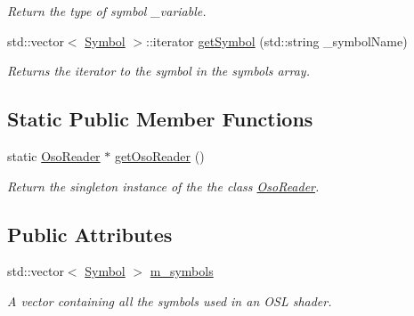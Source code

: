 \begin{DoxyCompactItemize}
\begin{DoxyCompactList}\small\item\em Return the type of symbol \-\_\-variable. \end{DoxyCompactList}\item 
\hypertarget{class_oso_reader_a6a3e710f4ed28396847353cb69b9f15b}{std\-::vector$<$ \hyperlink{struct_symbol}{Symbol} $>$\-::iterator \hyperlink{class_oso_reader_a6a3e710f4ed28396847353cb69b9f15b}{get\-Symbol} (std\-::string \-\_\-symbol\-Name)}\label{class_oso_reader_a6a3e710f4ed28396847353cb69b9f15b}

\begin{DoxyCompactList}\small\item\em Returns the iterator to the symbol in the symbols array. \end{DoxyCompactList}\end{DoxyCompactItemize}
\subsection*{Static Public Member Functions}
\begin{DoxyCompactItemize}
\item 
\hypertarget{class_oso_reader_ab7a5a31334d84529054d412e879993e2}{static \hyperlink{class_oso_reader}{Oso\-Reader} $\ast$ \hyperlink{class_oso_reader_ab7a5a31334d84529054d412e879993e2}{get\-Oso\-Reader} ()}\label{class_oso_reader_ab7a5a31334d84529054d412e879993e2}

\begin{DoxyCompactList}\small\item\em Return the singleton instance of the the class \hyperlink{class_oso_reader}{Oso\-Reader}. \end{DoxyCompactList}\end{DoxyCompactItemize}
\subsection*{Public Attributes}
\begin{DoxyCompactItemize}
\item 
\hypertarget{class_oso_reader_aee9e7e92aa5b132e81e850e3578058ab}{std\-::vector$<$ \hyperlink{struct_symbol}{Symbol} $>$ \hyperlink{class_oso_reader_aee9e7e92aa5b132e81e850e3578058ab}{m\-\_\-symbols}}\label{class_oso_reader_aee9e7e92aa5b132e81e850e3578058ab}

\begin{DoxyCompactList}\small\item\em A vector containing all the symbols used in an O\-S\-L shader. \end{DoxyCompactList}\end{DoxyCompactItemize}
